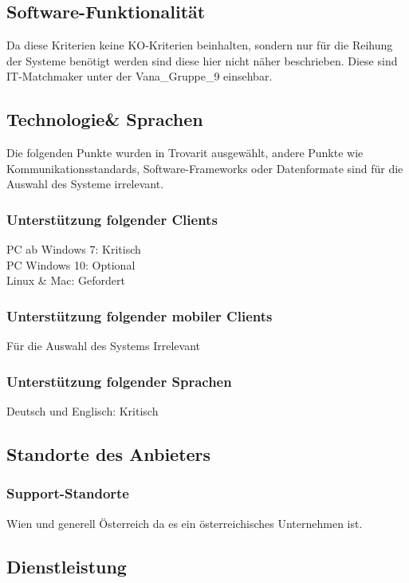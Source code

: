\subsection{Software-Funktionalität}
Da diese Kriterien keine KO-Kriterien beinhalten, sondern nur für die Reihung der Systeme benötigt werden sind diese hier nicht näher beschrieben. Diese sind IT-Matchmaker unter der Vana\_Gruppe\_9 einsehbar.


\subsection{Technologie\& Sprachen}
Die folgenden Punkte wurden in Trovarit ausgewählt, andere Punkte wie Kommunikationsstandards, Software-Frameworks oder Datenformate sind für die Auswahl des Systeme irrelevant.
\subsubsection{Unterstützung folgender Clients}
PC ab Windows 7: Kritisch\\
PC Windows 10: Optional\\
Linux \& Mac: Gefordert
\subsubsection{Unterstützung folgender mobiler Clients}
Für die Auswahl des Systems Irrelevant
\subsubsection{Unterstützung folgender Sprachen}
Deutsch und Englisch: Kritisch

\subsection{Standorte des Anbieters}
\subsubsection{Support-Standorte}
Wien und generell Österreich da es ein österreichisches Unternehmen ist.
\subsection{Dienstleistung}
